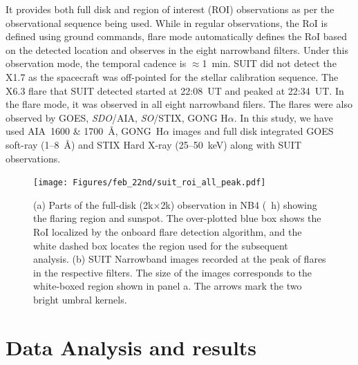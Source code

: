 It provides both full disk and region of interest (ROI) observations as per the observational sequence being used. While in regular observations, the RoI is defined using ground commands, flare mode automatically defines the RoI based on the detected location and observes in the eight narrowband filters. Under this observation mode, the temporal cadence is $\approx$1~min. SUIT did not detect the X1.7 as the spacecraft was off-pointed for the stellar calibration sequence. The X6.3 flare that SUIT detected started at 22:08~UT and peaked at 22:34~UT. In the flare mode, it was observed in all eight narrowband filers. The flares were also observed by GOES, {\it SDO}/AIA, {\it SO}/STIX, GONG H$\alpha$. In this study, we have used AIA~1600 \& 1700~{\AA}, GONG~H$\alpha$ images and full disk integrated GOES soft-ray (1{--}8~{\AA}) and STIX Hard X-ray (25{--}50~keV) along with SUIT observations.

\begin{figure}[!h]
    \centering
    \texttt{[image: Figures/feb\_22nd/suit\_roi\_all\_peak.pdf]} 
    \caption[SUIT observation of the flare in all NB filters at their respective peaks]{(a) Parts of the full-disk (2k$\times$2k) observation in NB4 (~h) showing the flaring region and sunspot. The over-plotted blue box shows the RoI localized by the onboard flare detection algorithm, and the white dashed box locates the region used for the subsequent analysis. (b) SUIT Narrowband images recorded at the peak of flares in the respective filters. The size of the images corresponds to the white-boxed region shown in panel a. The arrows mark the two bright umbral kernels.}
    \label{fig:flare_obs}
\end{figure}

\newpage

\section{Data Analysis and results}\label{res}

